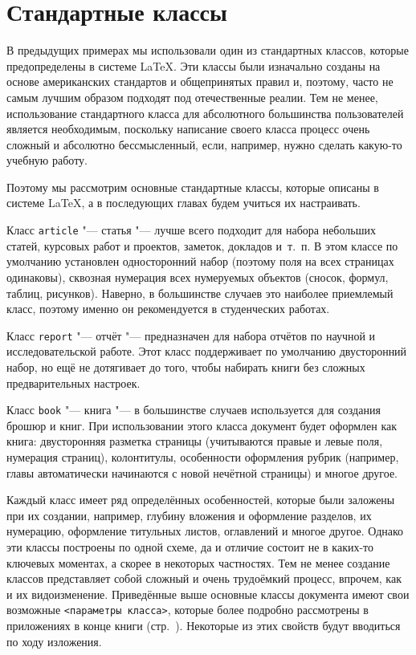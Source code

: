 
	\section{Стандартные классы}\label{Sec:StandardClasses}

В предыдущих примерах мы использовали один из стандартных классов, которые предопределены в системе \LaTeX. Эти классы были изначально созданы на основе американских стандартов и общепринятых правил и, поэтому, часто не самым лучшим образом подходят под отечественные реалии. Тем не менее, использование стандартного класса для абсолютного большинства пользователей является необходимым, поскольку написание своего класса процесс очень сложный и абсолютно бессмысленный, если, например, нужно сделать какую-то учебную работу. 

Поэтому мы рассмотрим основные стандартные классы, которые описаны в системе \LaTeX, а в последующих главах будем учиться их настраивать. 

Класс \texttt{article} "--- статья "--- лучше всего подходит для набора небольших статей, курсовых работ и проектов, заметок, докладов и~т.~п. В этом классе по умолчанию установлен односторонний набор (поэтому поля на всех страницах одинаковы), сквозная нумерация всех нумеруемых объектов (сносок, формул, таблиц, рисунков). Наверно, в большинстве случаев это наиболее приемлемый класс, поэтому именно он рекомендуется в студенческих работах.

Класс \texttt{report} "--- отчёт "--- предназначен для набора отчётов по научной и исследовательской работе. Этот класс поддерживает по умолчанию двусторонний набор, но ещё не дотягивает до того, чтобы набирать книги без сложных предварительных настроек.

Класс \texttt{book} "--- книга "--- в большинстве случаев используется для создания брошюр и книг. При использовании этого класса документ будет оформлен как книга: двусторонняя разметка страницы (учитываются правые и левые поля, нумерация страниц), колонтитулы, особенности оформления рубрик (например, главы автоматически начинаются с новой нечётной страницы) и многое другое.

Каждый класс имеет ряд определённых особенностей, которые были заложены при их создании, например, глубину вложения и оформление разделов, их нумерацию, оформление титульных листов, оглавлений и многое другое. Однако эти классы построены по одной схеме, да и отличие состоит не в каких-то ключевых моментах, а скорее в некоторых частностях. Тем не менее создание классов представляет собой сложный и очень трудоёмкий процесс, впрочем, как и их видоизменение. Приведённые выше основные классы документа имеют свои возможные \verb|<параметры класса>|, которые более подробно рассмотрены в приложениях в конце книги (стр.~\pageref{struct::ClassOptions->Appendix}). Некоторые из этих свойств будут вводиться по ходу изложения.


\endinput
